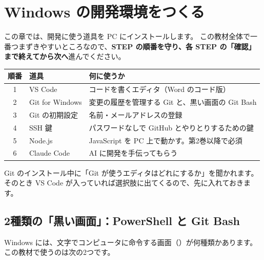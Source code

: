 \chapter{Windows の開発環境をつくる}

この章では、開発に使う道具を PC にインストールします。
この教材全体で一番つまずきやすいところなので、\textbf{STEP の順番を守り、各 STEP の「確認」まで終えてから次へ}進んでください。

\begin{center}\small
\begin{tabularx}{\linewidth}{c l X}
\toprule
順番 & 道具 & 何に使うか \\
\midrule
1 & VS Code & コードを書くエディタ（Word のコード版） \\
2 & Git for Windows & 変更の履歴を管理する Git と、黒い画面の Git Bash \\
3 & Git の初期設定 & 名前・メールアドレスの登録 \\
4 & SSH 鍵 & パスワードなしで GitHub とやりとりするための鍵 \\
5 & Node.js & JavaScript を PC 上で動かす。第2巻以降で必須 \\
6 & Claude Code & AI に開発を手伝ってもらう \\
\bottomrule
\end{tabularx}
\end{center}

\begin{why}
Git のインストール中に「Git が使うエディタはどれにするか」を聞かれます。
そのとき VS Code が入っていれば選択肢に出てくるので、先に入れておきます。
\end{why}

\section{2種類の「黒い画面」：PowerShell と Git Bash}

Windows には、文字でコンピュータに命令する画面（）が何種類かあります。
この教材で使うのは次の2つです。

